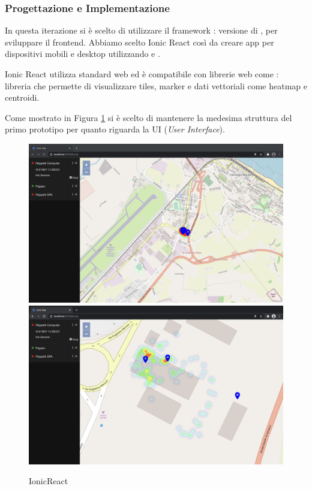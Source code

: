 \documentclass[a4paper]{report}
\begin{document}
\subsubsection*{{Progettazione e Implementazione}}
In questa iterazione si è scelto di utilizzare il framework \cite*{IonicReact}: versione \cite*{React} di \cite*{Ionic}, per sviluppare il frontend. Abbiamo scelto Ionic React così da creare app per dispositivi mobili e desktop utilizzando \cite*{Capacitor} e \cite*{Electron}.

Ionic React utilizza standard web ed è compatibile con librerie web come \cite*{OpenLayers}: libreria che permette di visualizzare tiles, marker e dati vettoriali come heatmap e centroidi. 

Come mostrato in Figura \ref{IonicReact_2iterazione} si è scelto di mantenere la medesima struttura del primo prototipo per quanto riguarda la UI (\textit{User Interface}).
\begin{figure}[tbp]
    \centering
    \includegraphics[width=.7\textwidth]{figure/ionicreact_2iterazione_large.png}\hfill
    \includegraphics[width=.7\textwidth]{figure/ionicreact_2iterazione_small.png}\hfill

    \caption{IonicReact}
    \label{IonicReact_2iterazione}
\end{figure}
\end{document}
